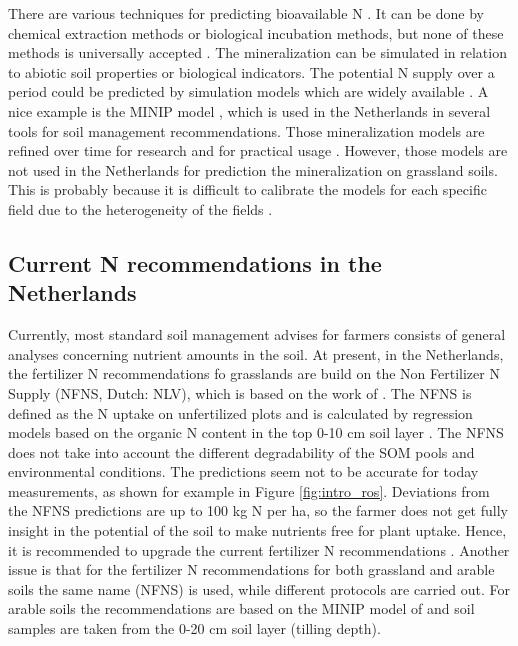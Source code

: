 \documentclass[10pt,twoside,dutch,english]{report}
\begin{document}
	There are various techniques for predicting bioavailable N \citep{Haynes2005}. It can be done by chemical extraction methods or biological incubation methods, but none of these methods is universally accepted \citep{Nannipieri2009}. The mineralization can be simulated in relation to abiotic soil properties or biological indicators. The potential N supply over a period could be predicted by simulation models which are widely available \citep{Manzoni2009}. A nice example is the MINIP model \citep{Janssen1984}, which is used in the Netherlands in several tools for soil management recommendations. Those mineralization models are refined over time for research and for practical usage \citep{Yang2000,Postma2004}.  However, those models are not used in the Netherlands for prediction the mineralization on grassland soils. This is probably because it is difficult to calibrate the models for each specific field due to the heterogeneity of the fields \citep{Ros2015}. 
		
\subsection{Current N recommendations in the Netherlands} %
Currently, most standard soil management advises for farmers consists of general analyses concerning nutrient amounts in the soil. At present, in the Netherlands, the fertilizer N recommendations fo grasslands are build on the Non Fertilizer N Supply (NFNS, Dutch: NLV), which is based on the work of \citet{Hassink1995a}. The NFNS is defined as the N uptake on unfertilized plots and is calculated by regression models based on the organic N content in the top 0-10 cm soil layer \citep{Bemestingscommissie2012}. The NFNS does not take into account the different degradability of the SOM pools and environmental conditions. The predictions seem not to be accurate for today measurements, as shown for example in Figure \ref{fig:intro_ros}. Deviations from the NFNS predictions are up to 100 kg N per ha, so the farmer does not get fully insight in the potential of the soil to make nutrients free for plant uptake. Hence, it is recommended to upgrade the current fertilizer N recommendations \citep{Hanegraaf2009, VanEekeren2010, Ros2015}. Another issue is that for the fertilizer N recommendations for both grassland and arable soils the same name (NFNS) is used, while different protocols are carried out. For arable soils the recommendations are based on the MINIP model of \citet{Janssen1984} and soil samples are taken from the 0-20 cm soil layer (tilling depth).\\
\end{document}
